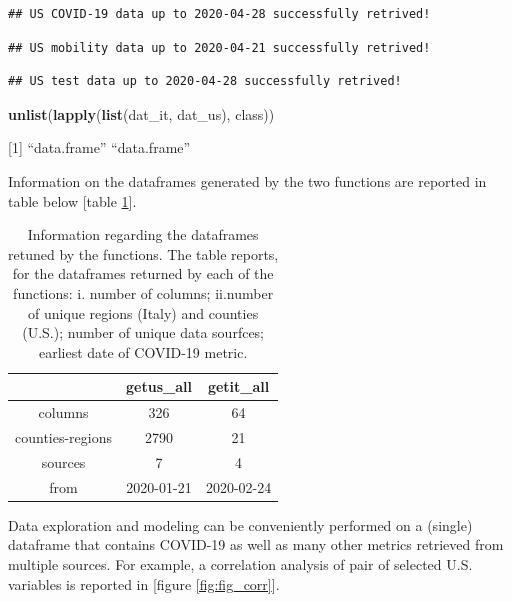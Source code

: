 \documentclass[12pt,halfline,a4paper,]{ouparticle}
\newenvironment{Shaded}{\begin{snugshade}}{\end{snugshade}}
\newcommand{\KeywordTok}[1]{\textcolor[rgb]{0.13,0.29,0.53}{\textbf{#1}}}
\newcommand{\NormalTok}[1]{#1}
\begin{document}
\begin{verbatim}
## US COVID-19 data up to 2020-04-28 successfully retrived!
\end{verbatim}

\begin{verbatim}
## US mobility data up to 2020-04-21 successfully retrived!
\end{verbatim}

\begin{verbatim}
## US test data up to 2020-04-28 successfully retrived!
\end{verbatim}

\begin{Shaded}
\begin{Highlighting}[]
\KeywordTok{unlist}\NormalTok{(}\KeywordTok{lapply}\NormalTok{(}\KeywordTok{list}\NormalTok{(dat_it, dat_us), class))}
\end{Highlighting}
\end{Shaded}

{[}1{]} ``data.frame'' ``data.frame''

\bigskip

Information on the dataframes generated by the two functions are
reported in table below {[}table \ref{tab:tab_dat}{]}.

\bigskip

\begin{table}[ht]
\centering
\begin{tabular}{ccc}
  \hline
 & getus\_all & getit\_all \\ 
  \hline
columns & 326 & 64 \\ 
  counties-regions & 2790 & 21 \\ 
  sources & 7 & 4 \\ 
  from & 2020-01-21 & 2020-02-24 \\ 
   \hline
\end{tabular}
\caption{Information regarding the dataframes retuned by the functions.
    The table reports, for the dataframes returned by each of the functions: i. number of columns; ii.number of unique regions (Italy) and counties (U.S.);  number of unique data sourfces; earliest date of COVID-19 metric.
    } 
\label{tab:tab_dat}
\end{table}

Data exploration and modeling can be conveniently performed on a
(single) dataframe that contains COVID-19 as well as many other metrics
retrieved from multiple sources. For example, a correlation analysis of
pair of selected U.S. variables is reported in {[}figure
\ref{fig:fig_corr}{]}.
\end{document}
